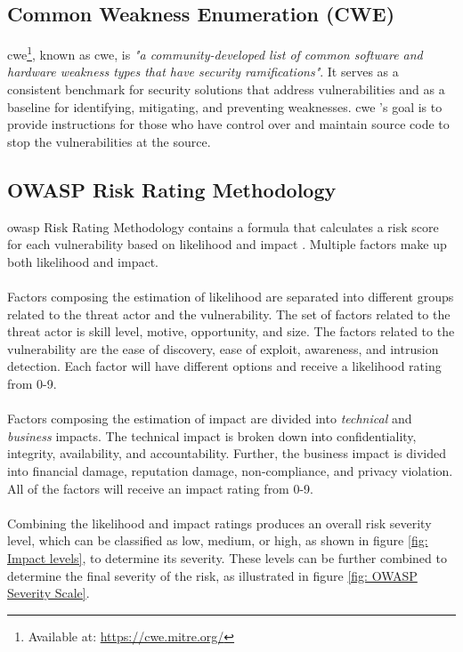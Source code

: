 \subsection{Common Weakness Enumeration (CWE)}
\label{cwe}
\acrlong{cwe}\footnote{Available at:
\url{https://cwe.mitre.org/}}, known as \acrshort{cwe}, is \textit{"a community-developed list of common software and hardware weakness types that have security ramifications"}\cite{CWE}. It serves as a consistent benchmark for security solutions that address vulnerabilities and as a baseline for identifying, mitigating, and preventing weaknesses. \acrshort{cwe} 's goal is to provide instructions for those who have control over and maintain source code to stop the vulnerabilities at the source. 

\subsection{OWASP Risk Rating Methodology}
\acrshort{owasp} Risk Rating Methodology contains a formula that calculates a risk score for each vulnerability based on likelihood and impact \cite{owasprisk}. Multiple factors make up both likelihood and impact. 
\\~\\
Factors composing the estimation of likelihood are separated into different groups related to the threat actor and the vulnerability. The set of factors related to the threat actor is skill level, motive, opportunity, and size. The factors related to the vulnerability are the ease of discovery, ease of exploit, awareness, and intrusion detection. Each factor will have different options and receive a likelihood rating from 0-9. 
\\~\\
Factors composing the estimation of impact are divided into \textit{technical} and \textit{business} impacts. The technical impact is broken down into confidentiality, integrity, availability, and accountability. Further, the business impact is divided into financial damage, reputation damage, non-compliance, and privacy violation. All of the factors will receive an impact rating from 0-9. 
\\~\\
Combining the likelihood and impact ratings produces an overall risk severity level, which can be classified as low, medium, or high, as shown in figure \ref{fig: Impact levels}, to determine its severity. These levels can be further combined to determine the final severity of the risk, as illustrated in figure \ref{fig: OWASP Severity Scale}.


